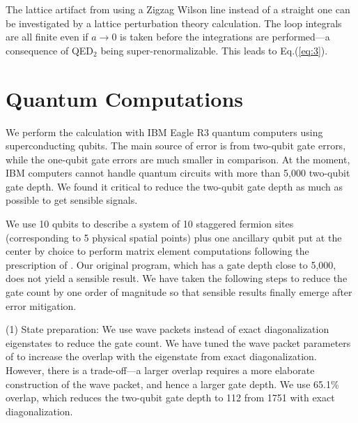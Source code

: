 \documentclass[aps,prd,twocolumn,tightenlines,superscriptaddress,
nofootinbib,preprintnumbers]{revtex4-1}
\newcommand{\Blue}[1]{\textcolor{black}{#1}}
\begin{document}
The lattice artifact from using a Zigzag Wilson line instead of a straight one 
can be investigated by a lattice perturbation theory calculation. The loop integrals are all finite even if $a\to 0$ is taken before the integrations are performed---a consequence of QED$_2$ being super-renormalizable. This leads to Eq.(\ref{eq:3}).

\section{Quantum Computations}
\label{QC}

We perform the calculation with IBM Eagle R3 
quantum computers using superconducting qubits. The main source of error is from two-qubit gate errors, while the one-qubit gate errors are much smaller in comparison. At the moment, IBM computers cannot handle quantum circuits with more than 5,000 two-qubit gate depth. 
We found it critical to reduce the two-qubit gate depth as much as possible to get sensible signals.  

We use 10 qubits to describe a system of 10 staggered fermion sites (corresponding to 5 physical spatial points) plus one ancillary qubit put at the center by choice to perform matrix element computations following the prescription of \cite{PhysRevLett.113.020505,Li:2021kcs}. 
Our original program, which has a gate depth close to 5,000, does not yield a sensible result. We have taken the following steps to reduce the gate count by one order of magnitude so that sensible results finally emerge after error mitigation. 

 
(1) State preparation: We use wave packets instead of exact diagonalization eigenstates to reduce the gate count. We have tuned the wave packet parameters of \cite{Farrell:2023fgd,Farrell:2024fit} to increase the overlap with the eigenstate from exact diagonalization. However, there is a trade-off---a larger overlap requires a more elaborate construction of the wave packet, and hence a larger gate depth. We use 65.1\% overlap, which reduces the two-qubit gate depth to 112 from 1751 with exact diagonalization.

\end{document}
